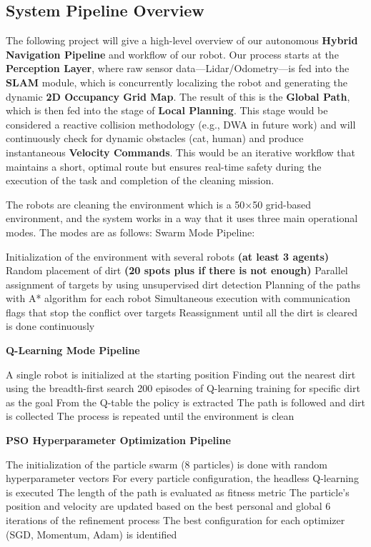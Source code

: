 \documentclass[12pt,a4paper]{report}
\begin{document}
\begin{itemize}
\chapter{System Pipeline Overview}
The following project will give a high-level overview of our autonomous \textbf{Hybrid Navigation Pipeline} and workflow of our robot. Our process starts at the \textbf{Perception Layer}, where raw sensor data—Lidar/Odometry—is fed into the \textbf{SLAM} module, which is concurrently localizing the robot and generating the dynamic \textbf{2D Occupancy Grid Map}.  The result of this is the \textbf{Global Path}, which is then fed into the stage of \textbf{Local Planning}. This stage would be considered a reactive collision methodology (e.g., DWA in future work) and will continuously check for dynamic obstacles (cat, human) and produce instantaneous \textbf{Velocity Commands}. This would be an iterative workflow that maintains a short, optimal route but ensures real-time safety during the execution of the task and completion of the cleaning mission.

The robots are cleaning the environment which is a 50×50 grid-based environment, and the system works in a way that it uses three main operational modes. The modes are as follows:
Swarm Mode Pipeline:

Initialization of the environment with several robots \textbf{(at least 3 agents)}
Random placement of dirt \textbf{(20 spots plus if there is not enough)}
Parallel assignment of targets by using unsupervised dirt detection
Planning of the paths with A* algorithm for each robot
Simultaneous execution with communication flags that stop the conflict over targets
Reassignment until all the dirt is cleared is done continuously

\textbf {Q-Learning Mode Pipeline}

A single robot is initialized at the starting position
Finding out the nearest dirt using the breadth-first search
200 episodes of Q-learning training for specific dirt as the goal
From the Q-table the policy is extracted
The path is followed and dirt is collected
The process is repeated until the environment is clean 

\textbf {PSO Hyperparameter Optimization Pipeline}

The initialization of the particle swarm (8 particles) is done with random hyperparameter vectors
For every particle configuration, the headless Q-learning is executed
The length of the path is evaluated as fitness metric
The particle’s position and velocity are updated based on the best personal and global
6 iterations of the refinement process
The best configuration for each optimizer (SGD, Momentum, Adam) is identified


\end{itemize}
\end{document}
